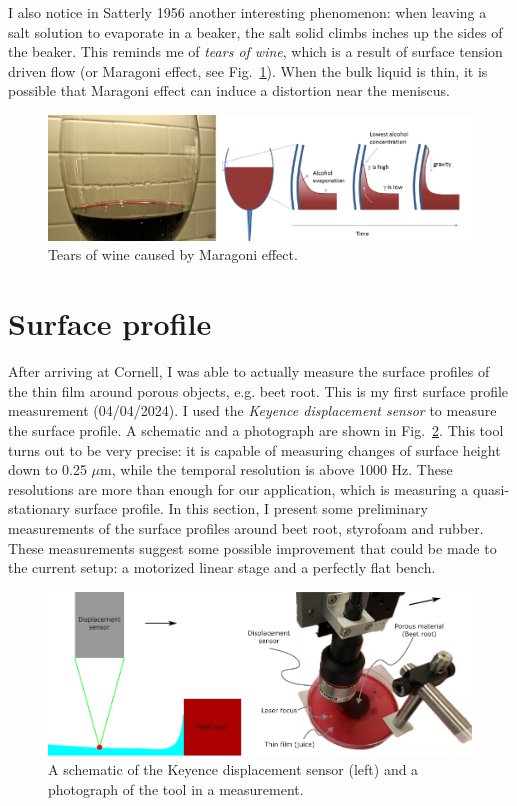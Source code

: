 \documentclass[12pt]{article}
\begin{document}
I also notice in Satterly 1956 \cite{Satterly1956} another interesting phenomenon: when leaving a salt solution to evaporate in a beaker, the salt solid climbs inches up the sides of the beaker. This reminds me of \emph{tears of wine}, which is a result of surface tension driven flow (or Maragoni effect, see Fig.~\ref{fig:tears-of-wine}). When the bulk liquid is thin, it is possible that Maragoni effect can induce a distortion near the meniscus.

\begin{figure}
    \centering
    \includegraphics[width=\textwidth]{Figures/tears-of-wine.pdf}
    \caption{Tears of wine caused by Maragoni effect.}
    \label{fig:tears-of-wine}
\end{figure}

\section{Surface profile}

After arriving at Cornell, I was able to actually measure the surface profiles of the thin film around porous objects, e.g. beet root.
This is my first surface profile measurement (04/04/2024).
I used the \textit{Keyence displacement sensor} to measure the surface profile. A schematic and a photograph are shown in Fig.~\ref{fig:surface-profiling}. 
This tool turns out to be very precise: it is capable of measuring changes of surface height down to 0.25 $\mu$m, while the temporal resolution is above 1000 Hz. 
These resolutions are more than enough for our application, which is measuring a quasi-stationary surface profile. 
In this section, I present some preliminary measurements of the surface profiles around beet root, styrofoam and rubber. 
These measurements suggest some possible improvement that could be made to the current setup: a motorized linear stage and a perfectly flat bench. 

\begin{figure}
    \centering
    \includegraphics[width=\textwidth]{Figures/surface_profiling.pdf}
    \caption{A schematic of the Keyence displacement sensor (left) and a photograph of the tool in a measurement.}
    \label{fig:surface-profiling}
\end{figure}
\end{document}
